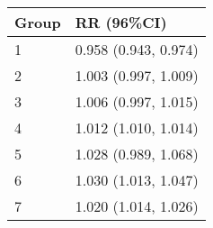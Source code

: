 \begin{tabular}{ll}
  \hline
Group & RR (96\%CI) \\ 
  \hline
   1 & 0.958 (0.943, 0.974) \\ 
     2 & 1.003 (0.997, 1.009) \\ 
     3 & 1.006 (0.997, 1.015) \\ 
     4 & 1.012 (1.010, 1.014) \\ 
     5 & 1.028 (0.989, 1.068) \\ 
     6 & 1.030 (1.013, 1.047) \\ 
     7 & 1.020 (1.014, 1.026) \\ 
   \hline
\end{tabular}

